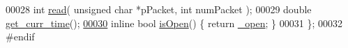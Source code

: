 \begin{DoxyCode}
00028     \textcolor{keywordtype}{int} \hyperlink{a00003_ac36331febb2eaa66303af3483795742a}{read}( \textcolor{keywordtype}{unsigned} \textcolor{keywordtype}{char} *pPacket, \textcolor{keywordtype}{int} numPacket );
00029     \textcolor{keywordtype}{double} \hyperlink{a00003_a6b6b7381c45308662fc3df6e7f74bc61}{get\_curr\_time}();
\hypertarget{a00013_source_l00030}{}\hyperlink{a00003_a88bba601b5c9f285fcdc14e18a1f3398}{00030}     \textcolor{keyword}{inline} \textcolor{keywordtype}{bool} \hyperlink{a00003_a88bba601b5c9f285fcdc14e18a1f3398}{isOpen}() \{ \textcolor{keywordflow}{return} \hyperlink{a00003_a04831154c43fe4f7499ea0950e0f0999}{\_open}; \}
00031 \};
00032 \textcolor{preprocessor}{#endif}
\end{DoxyCode}
